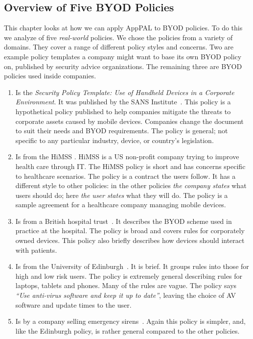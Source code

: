 \documentclass[thesis.tex]{subfiles}
\begin{document}
\subsection{Overview of Five BYOD Policies}
\label{sec:overview-of-five-byod-policies}

This chapter looks at how we can apply AppPAL to
BYOD policies.  To do this we analyze of five \emph{real-world} policies.
We chose the policies from a variety of domains.  They cover a range
of different policy styles and concerns.  Two are example policy
templates a company might want to base its own BYOD policy on,
published by security advice organizations.  The remaining three are
BYOD policies used inside companies.

\begin{enumerate}
\item Is the \emph{Security Policy Template: Use of Handheld Devices
    in a Corporate Environment}. It was published by the SANS
  Institute~\cite{nicholas_r._c._guerin_security_2008}. This policy is a
  hypothetical policy published to help companies mitigate the threats
  to corporate assets caused by mobile devices. Companies change the
  document to suit their needs and BYOD requirements. The policy is
  general; not specific to any particular industry, device, or country's
  legislation.
\item Is from the \ac{HiMSS}
  \cite{healthcare_information_and_management_systems_society_mobile_2012}.
  \ac{HiMSS} is a US non-profit company trying to improve health care through IT.
  The \ac{HiMSS} policy is short and has concerns specific to
  healthcare scenarios. The policy is a contract the users follow. It has
  a different style to other policies: in the other policies \emph{the company states}
  what users should do; here \emph{the user states} what they will do. The policy is
  a sample agreement for a healthcare company managing mobile
  devices.
\item Is from a British hospital trust~\cite{kennington_mobiles_2014}.
  It describes the BYOD scheme used in practice at the hospital.  The
  policy is broad and covers rules for corporately owned devices.  This
  policy also briefly describes how devices should interact with
  patients.
\item Is from the University of
  Edinburgh~\cite{williamson_bring_2015}. It is brief. It groups
  rules into those for high and low risk users.  The policy is extremely general describing rules for
  laptops, tablets and phones.  Many of the rules are vague.
  The policy says \emph{``Use anti-virus software and keep it up
    to date''}, leaving the choice of AV software and
  update times to the user.
\item Is by a company selling emergency
  sirens~\cite{code3pse.org_sample_nodate}. Again this policy is simpler,
  and, like the Edinburgh policy, is rather general compared to the other policies.
\end{enumerate}
\end{document}
